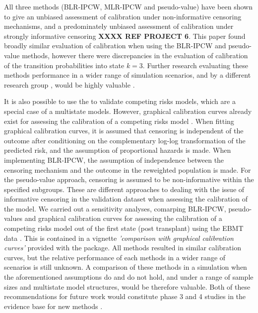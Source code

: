 \documentclass[article,shortnames]{jss}
\begin{document}
All three methods (BLR-IPCW, MLR-IPCW and pseudo-value) have been shown to give an unbiased assessment of calibration under non-informative censoring mechanisms, and a predominately unbiased assessment of calibration under strongly informative censoring \textbf{XXXX REF PROJECT 6}. This paper found broadly similar evaluation of calibration when using the BLR-IPCW and pseudo-value methods, however there were discrepancies in the evaluation of calibration of the transition probabilities into state $k = 3$. Further research evaluating these methods performance in a wider range of simulation scenarios, and by a different research group \citep{Boulesteix2013}, would be highly valuable \citep{Heinze2022}.

It is also possible to use the  to validate competing risks models, which are a special case of a multistate models. However, graphical calibration curves already exist for assessing the calibration of a competing risks model \citep{Austin2022}. When fitting graphical calibration curves, it is assumed that censoring is independent of the outcome after conditioning on the complementary log-log transformation of the predicted risk, and the assumption of proportional hazards is made. When implementing BLR-IPCW, the assumption of independence between the censoring mechanism and the outcome in the reweighted population is made. For the pseudo-value approach, censoring is assumed to be non-informative within the specified subgroups. These are different approaches to dealing with the issue of informative censoring in the validation dataset when assessing the calibration of the model. We carried out a sensitivity analyses, comarping BLR-IPCW, pseudo-values and graphical calibration curves for assessing the calibration of a competing risks model out of the first state (post transplant) using the EBMT data \citep{EBMT2023}. This is contained in a vignette \emph{'comparison with graphical calibration curves'} provided with the package. All methods resulted in similar calibration curves, but the relative performance of each methods in a wider range of scenarios is still unknown. A comparison of these methods in a simulation when the aforementioned assumptions do and do not hold, and under a range of sample sizes and multistate model structures, would be therefore valuable. Both of these recommendations for future work would constitute phase 3 and 4 studies in the evidence base for new methods \citep{Heinze2022}.
\end{document}
